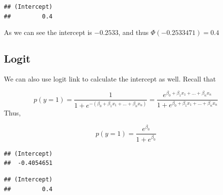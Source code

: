 \documentclass[]{book}
\newenvironment{Shaded}{\begin{snugshade}}{\end{snugshade}}
\newcommand{\KeywordTok}[1]{\textcolor[rgb]{0.13,0.29,0.53}{\textbf{#1}}}
\newcommand{\DataTypeTok}[1]{\textcolor[rgb]{0.13,0.29,0.53}{#1}}
\newcommand{\DecValTok}[1]{\textcolor[rgb]{0.00,0.00,0.81}{#1}}
\newcommand{\StringTok}[1]{\textcolor[rgb]{0.31,0.60,0.02}{#1}}
\newcommand{\OperatorTok}[1]{\textcolor[rgb]{0.81,0.36,0.00}{\textbf{#1}}}
\newcommand{\NormalTok}[1]{#1}
\begin{document}
\begin{Shaded}
\end{Shaded}

\begin{verbatim}
## (Intercept) 
##         0.4
\end{verbatim}

As we can see the intercept is \(-0.2533\), and thus
\(\Phi(-0.2533471)=0.4\)

\subsection{Logit}\label{logit-1}

We can also use logit link to calculate the intercept as well. Recall
that

\[p(y=1)=\frac{1}{1+e^{-(\beta_0+\beta_1x_1+...+\beta_nx_n)}}=\frac{e^{\beta_0+\beta_1x_1+...+\beta_nx_n}}{1+e^{\beta_0+\beta_1x_1+...+\beta_nx_n}}\]
Thus,

\[p(y=1)=\frac{e^{\beta_0}}{1+e^{\beta_0}}\]

\begin{Shaded}
\end{Shaded}

\begin{verbatim}
## (Intercept) 
##  -0.4054651
\end{verbatim}

\begin{Shaded}
\end{Shaded}

\begin{verbatim}
## (Intercept) 
##         0.4
\end{verbatim}
\end{document}
